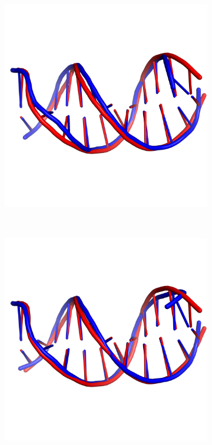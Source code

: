 \begin{figure}[!p]

  \begin{subfigure}{.5\linewidth}
    \includegraphics[width=\linewidth]{figures/discusion/rsron/1d65_best.png}
    \caption{}
  \end{subfigure}%
~
  \begin{subfigure}{.5\linewidth}
    \includegraphics[width=\linewidth]{figures/discusion/rsron/1d65_rmsd.png}
    \caption{}
  \end{subfigure}


\end{figure}
